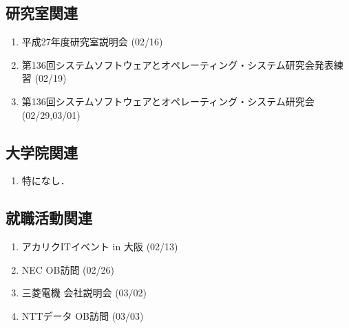 \documentclass[fleqn, 12pt]{extarticle}
\begin{document}
    \subsection{研究室関連}
    \label{sec-2-2}
    \begin{enumerate}

        \item 平成27年度研究室説明会
            \hfill
            \label{enum-18}
            (02/16)

        \item 第136回システムソフトウェアとオペレーティング・システム研究会発表練習
            \hfill
            \label{enum-19}
            (02/19)

        \item 第136回システムソフトウェアとオペレーティング・システム研究会
            \hfill
            \label{enum-20}
            (02/29,03/01)

    \end{enumerate}

    \subsection{大学院関連}
    \label{sec2-3}
    \begin{enumerate}

        \item 特になし．
            \hfill
            \label{enum-univ1}

    \end{enumerate}

    \subsection{就職活動関連}
    \label{sec2-3}
    \begin{enumerate}

        \item アカリクITイベント in 大阪
            \hfill
            \label{enum-univ1}
            (02/13)

        \item NEC OB訪問
            \hfill
            \label{enum-univ1}
            (02/26)

        \item 三菱電機 会社説明会
            \hfill
            \label{enum-univ1}
            (03/02)

        \item NTTデータ OB訪問
            \hfill
            \label{enum-univ1}
            (03/03)

    \end{enumerate}
\end{document}
